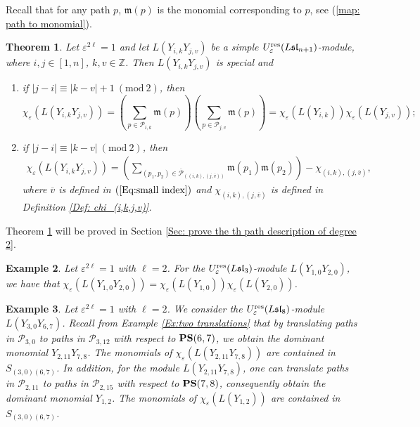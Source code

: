 \documentclass[12pt, reqno]{amsart}
\newtheorem{theorem}{Theorem}[section]
\newtheorem{example}[theorem]{Example}
\numberwithin{equation}{section}
\newcommand{\ZZ}{\mathbb{Z}}
\newcommand{\res}{{\rm res}}
\begin{document}
{Recall that for any path $p$, $\mathfrak{m}(p)$ is the monomial corresponding to $p$, see (\ref{map: path to monomial}).

\begin{theorem} \label{Th:path description of degree 2}
Let $\varepsilon^{2 \ell}=1$ and let $L(Y_{i,k}Y_{j,v})$ be a simple $U_{\varepsilon}^{\res}({L\mathfrak{sl}_{n+1}})$-module, where $i, j \in [1,n]$, $k, v \in \ZZ$. Then $L(Y_{i,k}Y_{j,v})$ is special and
\begin{enumerate}
\item if $|j-i|\equiv |k-v|+1\ (\text{mod}\ 2)$, then
\[
\chi_{\varepsilon}(L(Y_{i,k}Y_{j,v}))= \left(\sum_{p \in \mathscr{P}_{i,k}} \mathfrak{m}(p)\right) \left(\sum_{p \in \mathscr{P}_{j,v}} \mathfrak{m}(p)\right)=\chi_{\varepsilon}(L(Y_{i,k}))\chi_{\varepsilon}(L(Y_{j,v}));
\]
\item if $|j-i|\equiv |k-v|\ (\text{mod}\ 2)$, then
\begin{align*}
\chi_{\varepsilon}(L(Y_{i,k}Y_{j,v}))=\left(\sum_{(p_{1},p_{2}) \in \overline{\mathscr{P}}_{((i,k),(j,\overline{v}))}} \mathfrak{m}(p_1)\mathfrak{m}(p_2)\right)-\chi_{(i,k), (j,\overline{v})},
 \end{align*}
where $\overline{v}$ is defined in $(\ref{Eq:small index})$ and $\chi_{(i,k), (j,\overline{v})}$ is defined in Definition \ref{Def: chi_(i,k,j,v)}. 
\end{enumerate}
\end{theorem}

Theorem \ref{Th:path description of degree 2} will be proved in Section \ref{Sec: prove the th path description of degree 2}.

\begin{example}
Let $\varepsilon^{2 \ell}=1$ with $\ell=2$. For the $U_{\varepsilon}^{\res}({L\mathfrak{sl}_{3}})$-module $L(Y_{1,0}Y_{2,0})$, we have that $\chi_\varepsilon(L(Y_{1,0}Y_{2,0}))=\chi_\varepsilon(L(Y_{1,0})) \chi_\varepsilon(L(Y_{2,0}))$.
\end{example}


\begin{example}
Let $\varepsilon^{2 \ell}=1$ with $\ell=2$. We consider the $U_{\varepsilon}^{\res}({L\mathfrak{sl}_{8}})$-module $L(Y_{3,0}Y_{6,7})$.
Recall from Example \ref{Ex:two translations} that by translating paths in $\mathscr{P}_{3,0}$ to paths in $\mathscr{P}_{3,12}$ with respect to ${\bf PS}(6,7)$, we obtain the dominant monomial $Y_{2,11}Y_{7,8}$. The monomials of $\chi_\varepsilon(L(Y_{2,11}Y_{7,8}))$ are contained in $S_{(3,0)(6,7)}$. In addition, for the module $L(Y_{2,11}Y_{7,8})$, one can translate paths in $\mathscr{P}_{2,11}$ to paths in $\mathscr{P}_{2,15}$ with respect to ${\bf PS}(7,8)$, consequently obtain the dominant monomial $Y_{1,2}$. The monomials of $\chi_\varepsilon(L(Y_{1,2}))$ are contained in $S_{(3,0)(6,7)}$.


\end{example}}
\end{document}
